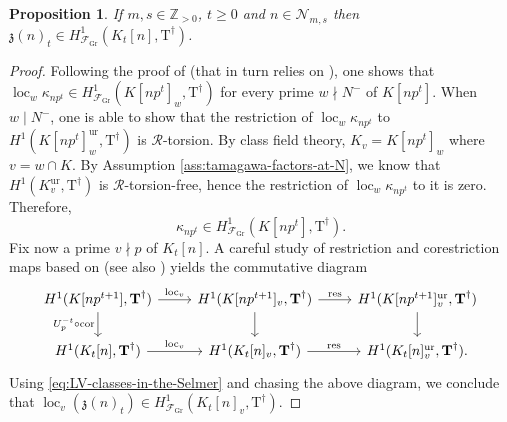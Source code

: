 \documentclass[12pt,reqno]{amsart}
\newtheorem{proposition}[theorem]{Proposition}
\theoremstyle{definition}
\theoremstyle{remark}
\newcommand{\numberset}{\mathbb}
\newcommand{\Z}{\numberset{Z}}
\newcommand{\T}{\boldsymbol{\mathrm{T}}}
\DeclareMathOperator{\Res}{res}
\DeclareMathOperator{\Cor}{cor}
\DeclareMathOperator{\loc}{loc}
\newcommand{\Gr}{\mathrm{Gr}}
\newcommand{\ur}{\mathrm{ur}}
\begin{document}
\begin{proposition}\label{prop:z-in-the-Selmer}
	If  $m,s\in\Z_{>0}$, $t\ge 0$ and $n\in\mathcal{N}_{m,s}$ then $\mathfrak{z}(n)_{t}\in H^1_{\mathcal{F}_{\Gr}}(K_t[n],\T^{\dag})$.
\end{proposition}
\begin{proof}
    Following the proof of \cite[Proposition 10.1]{Longo-Vigni11:quaternion-algebras-Hida-families} (that in turn relies on \cite[Proposition 2.4.5]{Howard07:variation-of-Heegner-points-in-Hida-families}), one shows that $\loc_w\kappa_{np^{t}}\in H^1_{\mathcal{F}_{\Gr}}(K[np^{t}]_w,\T^\dag)$ for every prime $w\nmid N^-$ of $K[np^{t}]$. When $w\mid N^-$, one is able to show that the restriction of $\loc_w\kappa_{np^{t}}$ to $H^1(K[np^{t}]_w^{\ur},\T^\dag)$ is $\mathcal{R}$-torsion. By class field theory, $K_{v}=K[np^{t}]_w$ where $v=w\cap K$. By Assumption \ref{ass:tamagawa-factors-at-N}, we know that $H^1(K_{v}^{\ur},\T^\dag)$ is $\mathcal{R}$-torsion-free, hence the restriction of $\loc_w\kappa_{np^{t}}$ to it is zero. Therefore,
    \begin{equation}\label{eq:LV-classes-in-the-Selmer}
        \kappa_{np^t}\in H^1_{\mathcal{F}_{\Gr}}(K[np^{t}],\T^{\dag}).
    \end{equation}
		Fix now a prime $v\nmid p$ of $K_t[n]$. A careful study of restriction and corestriction maps based on \cite[Proposition 1.5.6]{Neukirch-Schmidt-Wingberg:cohomology-of-number-fields} (see also \cite[§B.2]{mastella-zerman2025:anticyclotomic}) yields the commutative diagram
		\begin{equation*}
        \begin{tikzcd}
	{H^1(K[np^{t+1}],\T^{\dag})} & {H^1(K[np^{t+1}]_v,\T^{\dag})} & {H^1(K[np^{t+1}]_v^{\ur},\T^{\dag})} \\
	{H^1(K_t[n],\T^{\dag})} & {H^1(K_t[n]_v,\T^{\dag})} & {H^1(K_t[n]_v^{\ur},\T^{\dag}).}
	\arrow["{U_p^{-t}\circ\Cor}"', from=1-1, to=2-1]
	\arrow["{\loc_v}", from=1-1, to=1-2]
	\arrow["{\loc_v}", from=2-1, to=2-2]
	\arrow[from=1-2, to=2-2]
	\arrow["\Res", from=1-2, to=1-3]
	\arrow[from=1-3, to=2-3]
	\arrow["\Res", from=2-2, to=2-3]
        \end{tikzcd}
            \end{equation*}
		Using \eqref{eq:LV-classes-in-the-Selmer} and chasing the above diagram, we conclude that $\loc_v(\mathfrak{z}(n)_{t})\in H^1_{\mathcal{F}_{\Gr}}(K_t[n]_v,\T^{\dag})$.
		

\end{proof}
\end{document}
